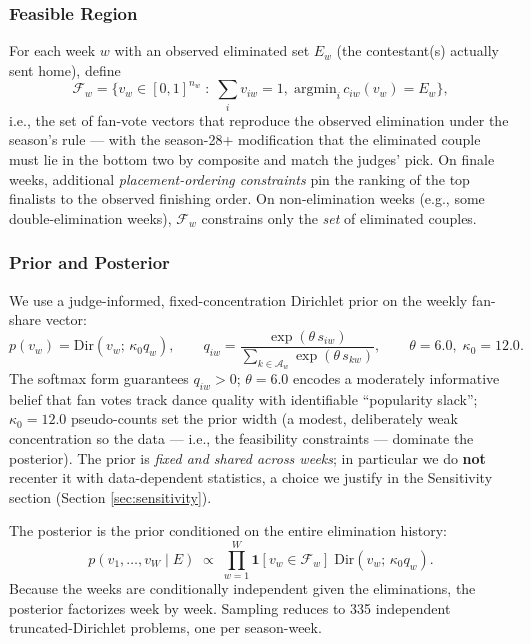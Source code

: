 \documentclass{article}
\begin{document}
\subsubsection{Feasible Region}

For each week $w$ with an observed eliminated set $E_w$ (the contestant(s) actually sent home), define
\begin{equation}
\mathcal{F}_w = \Big\{ v_w \in [0,1]^{n_w} \;:\; \textstyle\sum_i v_{iw} = 1,\; \text{argmin}_i\, c_{iw}(v_w) = E_w \Big\},
\label{eq:feasible}
\end{equation}
i.e., the set of fan-vote vectors that reproduce the observed elimination under the season's rule --- with the season-28+ modification that the eliminated couple must lie in the bottom two by composite and match the judges' pick. On finale weeks, additional \emph{placement-ordering constraints} pin the ranking of the top finalists to the observed finishing order. On non-elimination weeks (e.g., some double-elimination weeks), $\mathcal{F}_w$ constrains only the \emph{set} of eliminated couples.

\subsubsection{Prior and Posterior}

We use a judge-informed, fixed-concentration Dirichlet prior on the weekly fan-share vector:
\begin{equation}
p(v_w) = \mathrm{Dir}(v_w;\, \kappa_0 q_w), \qquad q_{iw} = \frac{\exp(\theta\, s_{iw})}{\sum_{k \in \mathcal{A}_w}\exp(\theta\, s_{kw})}, \qquad \theta = 6.0,\; \kappa_0 = 12.0.
\label{eq:m1-prior}
\end{equation}
The softmax form guarantees $q_{iw} > 0$; $\theta = 6.0$ encodes a moderately informative belief that fan votes track dance quality with identifiable ``popularity slack''; $\kappa_0 = 12.0$ pseudo-counts set the prior width (a modest, deliberately weak concentration so the data --- i.e., the feasibility constraints --- dominate the posterior). The prior is \emph{fixed and shared across weeks}; in particular we do \textbf{not} recenter it with data-dependent statistics, a choice we justify in the Sensitivity section (Section \ref{sec:sensitivity}).

The posterior is the prior conditioned on the entire elimination history:
\begin{equation}
p(v_1, \dots, v_W \mid E) \;\propto\; \prod_{w=1}^{W} \mathbf{1}[v_w \in \mathcal{F}_w]\; \mathrm{Dir}(v_w;\, \kappa_0 q_w).
\label{eq:m1-post}
\end{equation}
Because the weeks are conditionally independent given the eliminations, the posterior factorizes week by week. Sampling reduces to 335 independent truncated-Dirichlet problems, one per season-week.
\end{document}
